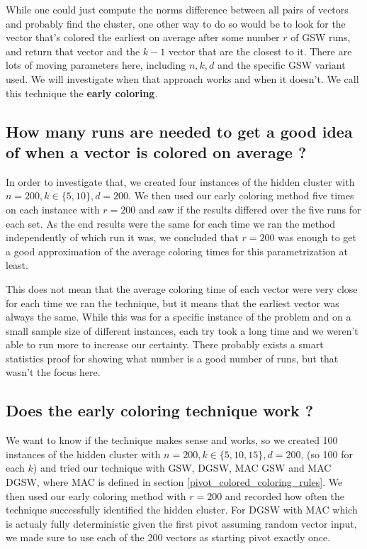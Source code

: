 \documentclass[12pt]{article}
\begin{document}
While one could just compute the norms difference between all pairs of vectors and probably find the cluster, one other way to do so would be to look for the vector that's colored the earliest on average after some number $r$ of GSW runs, and return that vector and the $k-1$ vector that are the closest to it. There are lots of moving parameters here, including $n,k,d$ and the specific GSW variant used. We will investigate when that approach works and when it doesn't. We call this technique the \textbf{early coloring}.

\subsection{How many runs are needed to get a good idea of when a vector is colored on average ?}
In order to investigate that, we created four instances of the hidden cluster with $n=200,k\in\{5,10\},d=200$. We then used our early coloring method five times on each instance with $r=200$ and saw if the results differed over the five runs for each set. As the end results were the same for each time we ran the method independently of which run it was, we concluded that $r=200$ was enough to get a good approximation of the average coloring times for this parametrization at least.

This does not mean that the average coloring time of each vector were very close for each time we ran the technique, but it means that the earliest vector was always the same. While this was for a specific instance of the problem and on a small sample size of different instances, each try took a long time and we weren't able to run more to increase our certainty. There probably exists a smart statistics proof for showing what number is a good number of runs, but that wasn't the focus here.

\subsection{Does the early coloring technique work ?}\label{early_work}
We want to know if the technique makes sense and works, so we created 100 instances of the hidden cluster with $n=200,k\in\{5,10,15\},d=200$, (so 100 for each $k$) and tried our technique with GSW, DGSW, MAC GSW and MAC DGSW, where MAC is defined in section \ref{pivot_colored_coloring_rules}. We then used our early coloring method with $r=200$ and recorded how often the technique successfully identified the hidden cluster. For DGSW with MAC which is actualy fully deterministic given the first pivot assuming random vector input, we made sure to use each of the 200 vectors as starting pivot exactly once.
\end{document}
